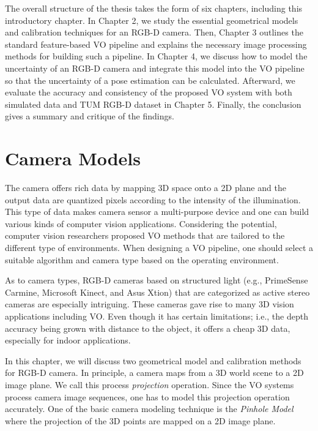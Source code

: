 \documentclass[a4paper]{report}
\numberwithin{figure}{section}
\begin{document}
The overall structure of the thesis takes the form of six chapters, including
this introductory chapter. In Chapter 2, we study the essential geometrical
models and calibration techniques for an RGB-D camera. Then, Chapter 3 outlines
the standard feature-based VO pipeline and explains the necessary image
processing methods for building such a pipeline. In Chapter 4, we discuss how
to model the uncertainty of an RGB-D camera and integrate this model into the
VO pipeline so that the uncertainty of a pose estimation can be calculated.
Afterward, we evaluate the accuracy and consistency of the proposed VO system
with both simulated data and TUM RGB-D dataset in Chapter 5. Finally, the
conclusion gives a summary and critique of the findings.





\chapter{Camera Models} \label{cp_cam_models}

The camera offers rich data by mapping 3D
space onto a 2D plane and the output data are quantized pixels according to the
intensity of the illumination.  This type of data makes camera sensor a
multi-purpose device and one can build various kinds of computer vision
applications.  Considering the potential, computer vision researchers proposed
VO methods that are tailored to the different type of environments.  When
designing a VO pipeline, one should select a suitable algorithm and camera type
based on the operating environment.

As to camera types, RGB-D cameras based on structured light (e.g., PrimeSense
Carmine, Microsoft Kinect, and Asus Xtion) that are categorized as active
stereo cameras are especially intriguing.  These cameras gave rise to many 3D
vision applications including VO. Even though it has certain limitations; i.e.,
the depth accuracy being grown with distance to the object, it offers a cheap 3D data, especially for
indoor applications. 


In this chapter, we will discuss two geometrical model and calibration methods
for RGB-D camera.  In principle, a camera maps from a 3D world scene to a 2D
image plane. We call this process \textit{projection} operation. Since the VO
systems process camera image sequences, one has to model this projection
operation accurately. One of the basic camera modeling technique is the
\textit{Pinhole Model} where the projection of the 3D points are mapped on a 2D
image plane.  
\end{document}
